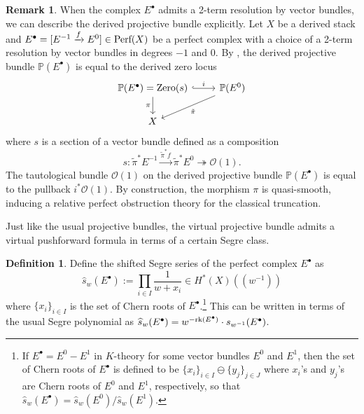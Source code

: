 \documentclass[10pt]{amsart}
\newcommand{\BP}{\mathbb{P}}
\newcommand{\CO}{\mathcal{O}}
\newcommand{\Perf}{\textnormal{Perf}}
\newcommand{\+}{{}^+}
\newcommand{\Zero}{\textnormal{Zero}}
\newcommand{\rk}{\textnormal{rk}}
\theoremstyle{definition}
\theoremstyle {definition}
\newtheorem{remark}[theorem]{Remark}
\theoremstyle {definition}
\newtheorem{definition}[theorem]{Definition}
\begin{document}
\begin{remark}\label{rem: derived projective bundle as derived zero}
When the complex $E^\bullet$ admits a 2-term resolution by vector bundles, we can describe the derived projective bundle explicitly. Let $X$ be a derived stack and $E^\bullet=[E^{-1}\xrightarrow{f}E^0]\in \Perf(X)$ be a perfect complex with a choice of a 2-term resolution by vector bundles in degrees $-1$ and $0$. By \cite[Prop. 4.33]{Jiang}, the derived projective bundle $\BP(E^\bullet)$ is equal to the derived zero locus 
\begin{equation*}
    \begin{tikzcd}
\BP(E^\bullet)=\Zero(s) \arrow[d, "\pi"'] \arrow[r, "i", hook] & \BP(E^0) \arrow[ld, "\tilde\pi"] \\
X                                       &                       
\end{tikzcd}
\end{equation*}
where $s$ is a section of a vector bundle defined as a composition
$$s:\tilde{\pi}^*E^{-1}\xrightarrow{\tilde{\pi}^*f}\tilde{\pi}^*E^0\twoheadrightarrow \CO(1).
$$
The tautological bundle $\CO(1)$ on the derived projective bundle $\BP(E^\bullet)$ is equal to the pullback $i^*\CO(1)$. By construction, the morphism $\pi$ is quasi-smooth, inducing a relative perfect obstruction theory for the classical truncation. 

\end{remark}

Just like the usual projective bundles, the virtual projective bundle admits a virtual pushforward formula in terms of a certain Segre class. 

\begin{definition}
    Define the shifted Segre series of the perfect complex $E^\bullet$ as
$$\widehat{s}_w(E^\bullet):=\prod_{i\in I}\frac{1}{w+x_i}\in H^*(X)(\!(w^{-1})\!)
$$
where $\{x_i\}_{i\in I}$ is the set of Chern roots of $E^\bullet$.\footnote{If $E^\bullet=E^0-E^1$ in $K$-theory for some vector bundles $E^0$ and $E^1$, then the set of Chern roots of $E^\bullet$ is defined to be $\{x_i\}_{i\in I}\ominus\{y_j\}_{j\in J}$ where $x_i$'s and $y_j$'s are Chern roots of $E^0$ and $E^1$, respectively, so that $\widehat{s}_w(E^\bullet)=\widehat{s}_w(E^0)/\widehat{s}_w(E^1)$.} This can be written in terms of the usual Segre polynomial as $\widehat s_w(E^\bullet)=w^{-\rk(E^\bullet)}\cdot s_{w^{-1}}(E^\bullet)$. 

\end{definition}
\end{document}
